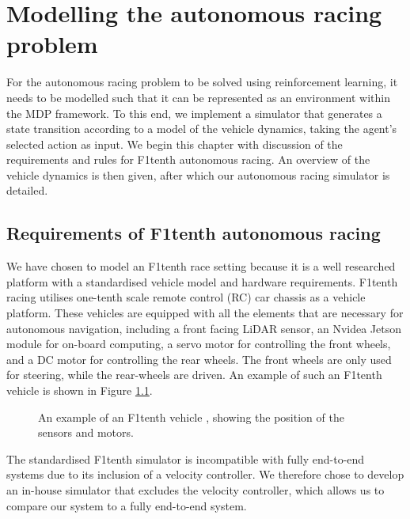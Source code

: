 \chapter{Modelling the autonomous racing problem}
\label{chp:modelling}

For the autonomous racing problem to be solved using reinforcement learning, it needs to be modelled such that it can be represented as an environment within the MDP framework.
To this end, we implement a simulator that generates a state transition according to a model of the vehicle dynamics, taking the agent's selected action as input.
We begin this chapter with discussion of the requirements and rules for F1tenth autonomous racing.
An overview of the vehicle dynamics is then given, after which our autonomous racing simulator is detailed. 


\section{Requirements of F1tenth autonomous racing}\label{sec:f1tenth_requirements}


We have chosen to model an F1tenth race setting because it is a well researched platform with a standardised vehicle model and hardware requirements.
F1tenth racing utilises one-tenth scale remote control (RC) car chassis as a vehicle platform.
These vehicles are equipped with all the elements that are necessary for autonomous navigation, including a front facing LiDAR sensor, an Nvidea Jetson module for on-board computing, a servo motor for controlling the front wheels, and a DC motor for controlling the rear wheels.
The front wheels are only used for steering, while the rear-wheels are driven.
An example of such an F1tenth vehicle is shown in Figure \ref{fig:sim_vehicle}.


\begin{figure}[htb!]
    \centering
    
    \caption[The simulated F1tenth vehicle]{An example of an F1tenth vehicle \cite{f1tenth}, showing the position of the sensors and motors.}
    \label{fig:sim_vehicle}
\end{figure}

The standardised F1tenth simulator is incompatible with fully end-to-end systems due to its inclusion of a velocity controller.
We therefore chose to develop an in-house simulator that excludes the velocity controller, which allows us to compare our system to a fully end-to-end system.

